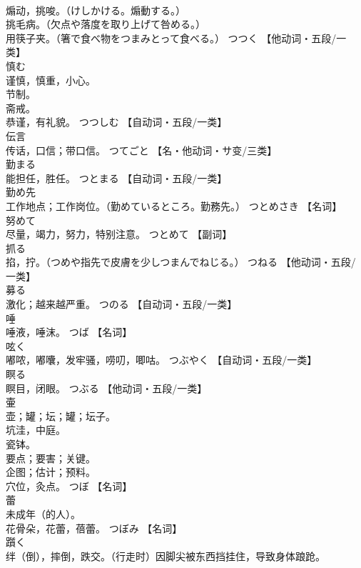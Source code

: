 \documentclass[8pt]{extreport}
\begin{document}
\begin{CJK}{UTF8}{min}
\\	煽动，挑唆。（けしかける。煽動する。） 
\\	挑毛病。（欠点や落度を取り上げて咎める。） 
\\	用筷子夹。（箸で食べ物をつまみとって食べる。）	つつく		【他动词・五段/一类】
\\	慎む	
\\	谨慎，慎重，小心。 
\\	节制。 
\\	斋戒。 
\\	恭谨，有礼貌。	つつしむ		【自动词・五段/一类】
\\	伝言	
\\	传话，口信；带口信。	つてごと		【名・他动词・サ变/三类】
\\	勤まる	
\\	能担任，胜任。	つとまる		【自动词・五段/一类】
\\	勤め先	
\\	工作地点；工作岗位。（勤めているところ。勤務先。）	つとめさき		【名词】
\\	努めて	
\\	尽量，竭力，努力，特别注意。	つとめて		【副词】
\\	抓る	
\\	掐，拧。（つめや指先で皮膚を少しつまんでねじる。）	つねる		【他动词・五段/一类】
\\	募る	
\\	激化；越来越严重。	つのる		【自动词・五段/一类】
\\	唾	
\\	唾液，唾沫。	つば		【名词】
\\	呟く	
\\	嘟哝，嘟囔，发牢骚，唠叨，唧咕。	つぶやく		【自动词・五段/一类】
\\	瞑る	
\\	瞑目，闭眼。	つぶる		【他动词・五段/一类】
\\	壷	
\\	壶；罐；坛；罐；坛子。 
\\	坑洼，中庭。 
\\	瓷钵。 
\\	要点；要害；关键。 
\\	企图；估计；预料。 
\\	穴位，灸点。	つぼ		【名词】
\\	蕾	
\\	未成年（的人）。 
\\	花骨朵，花蕾，蓓蕾。	つぼみ		【名词】
\\	躓く	
\\	绊（倒），摔倒，跌交。（行走时）因脚尖被东西挡挂住，导致身体踉跄。 

\end{CJK}
\end{document}
